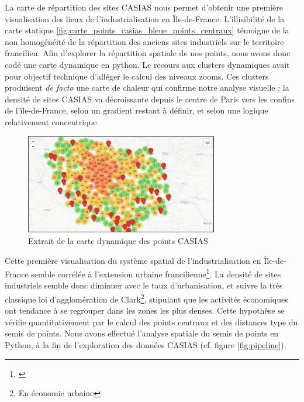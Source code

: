 \documentclass[a4paper,twoside,12pt]{book}
\begin{document}
La carte de répartition des sites CASIAS nous permet d'obtenir une première visualisation des lieux de l'industrialisation en Île-de-France. L'illisibilité de la carte statique \ref{fig:carte_points_casias_bleue_points_centraux} témoigne de la non homogénéité de la répartition des anciens sites industriels sur le territoire francilien. Afin d'explorer la répartition spatiale de nos points, nous avons donc codé une carte dynamique en python. Le recours aux clusters dynamiques avait pour objectif technique d'alléger le calcul des niveaux zooms. Ces clusters produisent \textit{de facto} une carte de chaleur qui confirme notre analyse visuelle : la densité de sites CASIAS va décroissante depuis le centre de Paris vers les confins de l'ïle-de-France, selon un gradient restant à définir, et selon une logique relativement concentrique. 

 \begin{figure}[!h]
\centering 
\includegraphics[width=0.75\textwidth]{img/chapitre3/CASIAS_Carte_Points_Folium.png}
\caption{Extrait de la carte dynamique des points CASIAS}
\label{fig:carte_cluster_casias}
\end{figure}

Cette première visualisation du système spatial de l'industrialisation en Île-de-France semble corrélée à l'extension urbaine francilienne\footnote{\cite{gallet_atlas_2020}}. La densité de sites industriels semble donc diminuer avec le taux d'urbanisation, et suivre la très classique loi d'agglomération de Clark\footnote{En économie urbaine}, stipulant que les activités économiques ont tendance à se regrouper dans les zones les plus denses. Cette hypothèse se vérifie quantitativement par le calcul des points centraux et des distances type du semis de points. Nous avons effectué l'analyse spatiale du semis de points en Python, à la fin de l'exploration des données CASIAS (cf. figure \ref{fig:pipeline}). 
\end{document}
